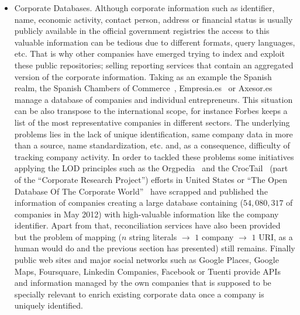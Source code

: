 \documentclass{llncs}
\begin{document}
\begin{itemize}
 
 \item Corporate Databases. Although corporate information such as identifier, name, economic activity, contact person, address or 
 financial status is usually publicly available in the official government registries the access to this valuable information can be 
 tedious due to different formats, query languages, etc. That is why other companies have emerged trying to index and exploit 
 these public repositories; selling reporting services that contain an aggregated version of the corporate information. Taking as 
 an example the Spanish realm, the Spanish Chambers of Commerce~\cite{CamaraSpain}, Empresia.es~\cite{Empresia} or Axesor.es~\cite{Axexor} manage a database of companies and individual  entrepreneurs. This situation can be also transpose to the international scope, for instance Forbes keeps a list of 
 the most representative companies in different sectors. The underlying problems lies in the lack of unique identification, same company data in more 
 than a source, name standardization, etc. and, as a consequence, difficulty of tracking company activity. In order to tackled these problems some 
 initiatives applying the LOD principles such as the Orgpedia~\cite{Orgpedia} and the CrocTail~\cite{croctail} (part of the ``Corporate Research Project'') efforts in United States or 
 ``The Open Database Of The Corporate World''~\cite{Opencorporates} have scrapped and published the information 
 of companies creating a large database containing ($54,080,317$ of companies in May 2012) with high-valuable information like the company 
 identifier. Apart from that, reconciliation services have also been provided but the problem of mapping ($n$ string literals $\to$ $1$ company $\to$ $1$ URI, 
 as a human would do and the previous section has presented) still remains. Finally public web sites and major social networks such as Google 
 Places, Google Maps, Foursquare, Linkedin Companies, Facebook or Tuenti provide APIs and information managed by the own companies that is supposed 
 to be specially relevant to enrich existing corporate data once a company is uniquely identified.
 
\end{itemize}
\end{document}
